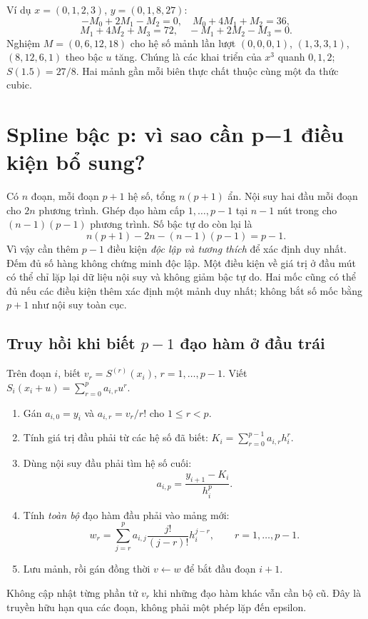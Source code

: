 Ví dụ $x=(0,1,2,3)$, $y=(0,1,8,27)$:
\[
-M_0+2M_1-M_2=0,\quad M_0+4M_1+M_2=36,
\]
\[
M_1+4M_2+M_3=72,\quad -M_1+2M_2-M_3=0.
\]
Nghiệm $M=(0,6,12,18)$ cho hệ số mảnh lần lượt
$(0,0,0,1)$, $(1,3,3,1)$, $(8,12,6,1)$ theo bậc $u$ tăng.
Chúng là các khai triển của $x^3$ quanh $0,1,2$; $S(1.5)=27/8$.
Hai mảnh gần mỗi biên thực chất thuộc cùng một đa thức cubic.

\section{Spline bậc p: vì sao cần p−1 điều kiện bổ sung?}
\label{sec:spline-degree-p}
Có $n$ đoạn, mỗi đoạn $p+1$ hệ số, tổng $n(p+1)$ ẩn.
Nội suy hai đầu mỗi đoạn cho $2n$ phương trình. Ghép đạo hàm cấp $1,\ldots,p-1$
tại $n-1$ nút trong cho $(n-1)(p-1)$ phương trình.
Số bậc tự do còn lại là
\[
n(p+1)-2n-(n-1)(p-1)=p-1.
\]
Vì vậy cần thêm $p-1$ điều kiện \emph{độc lập và tương thích} để xác định duy nhất.
Đếm đủ số hàng không chứng minh độc lập. Một điều kiện về giá trị ở đầu mút có thể chỉ lặp lại dữ liệu nội suy và không giảm bậc tự do.
Hai mốc cũng có thể đủ nếu các điều kiện thêm xác định một mảnh duy nhất; không bắt số mốc bằng $p+1$ như nội suy toàn cục.

\subsection{Truy hồi khi biết $p-1$ đạo hàm ở đầu trái}
\label{sec:spline-left-general}
Trên đoạn $i$, biết $v_r=S^{(r)}(x_i)$, $r=1,\ldots,p-1$.
Viết $S_i(x_i+u)=\sum_{r=0}^p a_{i,r}u^r$.
\begin{enumerate}
\item Gán $a_{i,0}=y_i$ và $a_{i,r}=v_r/r!$ cho $1\leq r<p$.
\item Tính giá trị đầu phải từ các hệ số đã biết:
$K_i=\sum_{r=0}^{p-1}a_{i,r}h_i^r$.
\item Dùng nội suy đầu phải tìm hệ số cuối:
\[
a_{i,p}=\frac{y_{i+1}-K_i}{h_i^p}.
\]
\item Tính \emph{toàn bộ} đạo hàm đầu phải vào mảng mới:
\[
w_r=\sum_{j=r}^{p}a_{i,j}\frac{j!}{(j-r)!}h_i^{j-r},\qquad r=1,\ldots,p-1.
\]
\item Lưu mảnh, rồi gán đồng thời $v\leftarrow w$ để bắt đầu đoạn $i+1$.
\end{enumerate}
Không cập nhật từng phần tử $v_r$ khi những đạo hàm khác vẫn cần bộ cũ.
Đây là truyền hữu hạn qua các đoạn, không phải một phép lặp đến epsilon.

